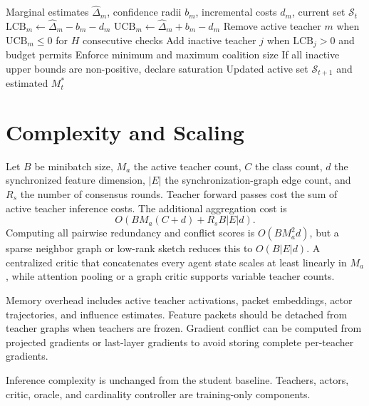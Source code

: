 \documentclass[10pt,twocolumn,a4paper]{article}
\newcommand{\cS}{\mathcal{S}}
\begin{document}
\begin{algorithm}[t]
\caption{Adaptive Teacher Cardinality}
\label{alg:cardinality}
\begin{algorithmic}[1]
\Require Marginal estimates \(\widehat\Delta_m\), confidence radii \(b_m\), incremental costs \(d_m\), current set \(\cS_t\)
    \State \(\mathrm{LCB}_m\gets\widehat\Delta_m-b_m-d_m\)
    \State \(\mathrm{UCB}_m\gets\widehat\Delta_m+b_m-d_m\)
\EndFor
\State Remove active teacher \(m\) when \(\mathrm{UCB}_m\le0\) for \(H\) consecutive checks
\State Add inactive teacher \(j\) when \(\mathrm{LCB}_j>0\) and budget permits
\State Enforce minimum and maximum coalition size
\State If all inactive upper bounds are non-positive, declare saturation
\Ensure Updated active set \(\cS_{t+1}\) and estimated \(M_t^*\)
\end{algorithmic}
\end{algorithm}

\section{Complexity and Scaling}
\label{sec:complexity}

Let \(B\) be minibatch size, \(M_a\) the active teacher count, \(C\) the class count, \(d\) the synchronized feature dimension, \(|E|\) the synchronization-graph edge count, and \(R_s\) the number of consensus rounds. Teacher forward passes cost the sum of active teacher inference costs. The additional aggregation cost is
\begin{equation}
 O\left(BM_a(C+d)+R_sB|E|d\right).
\label{eq:aggregationcomplexity}
\end{equation}
Computing all pairwise redundancy and conflict scores is \(O(BM_a^2d)\), but a sparse neighbor graph or low-rank sketch reduces this to \(O(B|E|d)\). A centralized critic that concatenates every agent state scales at least linearly in \(M_a\), while attention pooling or a graph critic supports variable teacher counts.

Memory overhead includes active teacher activations, packet embeddings, actor trajectories, and influence estimates. Feature packets should be detached from teacher graphs when teachers are frozen. Gradient conflict can be computed from projected gradients or last-layer gradients to avoid storing complete per-teacher gradients.

Inference complexity is unchanged from the student baseline. Teachers, actors, critic, oracle, and cardinality controller are training-only components.
\end{document}
